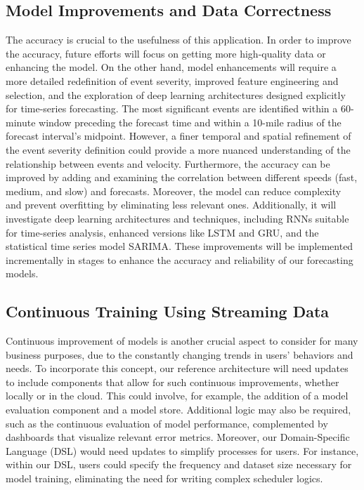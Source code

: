 \subsection{Model Improvements and Data Correctness}
 The accuracy is crucial to the usefulness of this application. In order to improve the accuracy, future efforts will focus on getting more high-quality data or enhancing the model. On the other hand, model enhancements will require a more detailed redefinition of event severity, improved feature engineering and selection, and the exploration of deep learning architectures designed explicitly for time-series forecasting. The most significant events are identified within a 60-minute window preceding the forecast time and within a 10-mile radius of the forecast interval's midpoint. However, a finer temporal and spatial refinement of the event severity definition could provide a more nuanced understanding of the relationship between events and velocity.
Furthermore, the accuracy can be improved by adding and examining the correlation between different speeds (fast, medium, and slow) and forecasts. Moreover, the model can reduce complexity and prevent overfitting by eliminating less relevant ones. Additionally, it will investigate deep learning architectures and techniques, including RNNs suitable for time-series analysis, enhanced versions like LSTM and GRU, and the statistical time series model SARIMA. These improvements will be implemented incrementally in stages to enhance the accuracy and reliability of our forecasting models.

\subsection{Continuous Training Using Streaming Data}

 Continuous improvement of models is another crucial aspect to consider for many business purposes, due to the constantly changing trends in users' behaviors and needs. To incorporate this concept, our reference architecture will need updates to include components that allow for such continuous improvements, whether locally or in the cloud. This could involve, for example, the addition of a model evaluation component and a model store. Additional logic may also be required, such as the continuous evaluation of model performance, complemented by dashboards that visualize relevant error metrics. Moreover, our Domain-Specific Language (DSL) would need updates to simplify processes for users. For instance, within our DSL, users could specify the frequency and dataset size necessary for model training, eliminating the need for writing complex scheduler logics.

